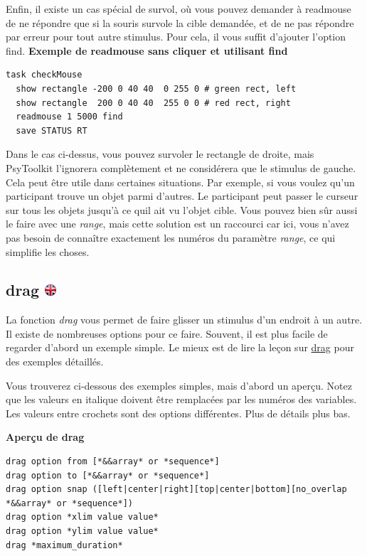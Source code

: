 \documentclass[
]{book}
\begin{document}
Enfin, il existe un cas spécial de survol, où vous pouvez demander à readmouse de ne répondre que si la souris survole la cible demandée, et de ne pas répondre par erreur pour tout autre stimulus. Pour cela, il vous suffit d'ajouter l'option find.
\textbf{Exemple de readmouse sans cliquer et utilisant find}

\begin{verbatim}
task checkMouse
  show rectangle -200 0 40 40  0 255 0 # green rect, left
  show rectangle  200 0 40 40  255 0 0 # red rect, right
  readmouse 1 5000 find
  save STATUS RT
\end{verbatim}

Dans le cas ci-dessus, vous pouvez survoler le rectangle de droite, mais PsyToolkit l'ignorera complètement et ne considérera que le stimulus de gauche. Cela peut être utile dans certaines situations. Par exemple, si vous voulez qu'un participant trouve un objet parmi d'autres. Le participant peut passer le curseur sur tous les objets jusqu'à ce quil ait vu l'objet cible. Vous pouvez bien sûr aussi le faire avec une \emph{range}, mais cette solution est un raccourci car ici, vous n'avez pas besoin de connaître exactement les numéros du paramètre \emph{range}, ce qui simplifie les choses.

\hypertarget{drag}{%
\subsection[drag ]{\texorpdfstring{drag \href{https://www.psytoolkit.org/doc3.4.0/syntax.html\#task-drag}{\protect\includegraphics{img/ukflag.png}}}{drag }}\label{drag}}

La fonction \emph{drag} vous permet de faire glisser un stimulus d'un endroit à un autre. Il existe de nombreuses options pour ce faire. Souvent, il est plus facile de regarder d'abord un exemple simple. Le mieux est de lire la leçon sur \href{https:/lessons/drag.html}{drag} pour des exemples détaillés.

Vous trouverez ci-dessous des exemples simples, mais d'abord un aperçu. Notez que les valeurs en italique doivent être remplacées par les numéros des variables. Les valeurs entre crochets sont des options différentes. Plus de détails plus bas.

\textbf{Aperçu de drag}

\begin{verbatim}
drag option from [*&&array* or *sequence*]
drag option to [*&&array* or *sequence*]
drag option snap ([left|center|right][top|center|bottom][no_overlap *&&array* or *sequence*])
drag option *xlim value value*
drag option *ylim value value*
drag *maximum_duration*
\end{verbatim}
\end{document}
